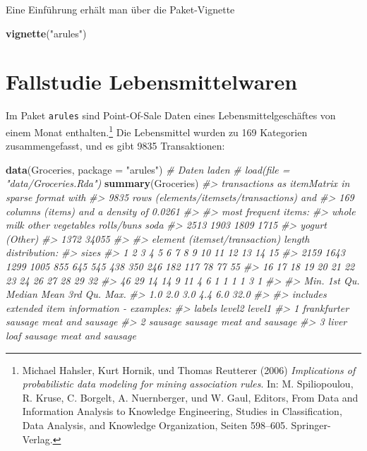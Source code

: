 \documentclass[12pt,]{book}
\newenvironment{Shaded}{\begin{snugshade}}{\end{snugshade}}
\newcommand{\KeywordTok}[1]{\textcolor[rgb]{0.13,0.29,0.53}{\textbf{{#1}}}}
\newcommand{\DataTypeTok}[1]{\textcolor[rgb]{0.13,0.29,0.53}{{#1}}}
\newcommand{\StringTok}[1]{\textcolor[rgb]{0.31,0.60,0.02}{{#1}}}
\newcommand{\CommentTok}[1]{\textcolor[rgb]{0.56,0.35,0.01}{\textit{{#1}}}}
\newcommand{\NormalTok}[1]{{#1}}
\let\rmarkdownfootnote\footnote%
\def\footnote{\protect\rmarkdownfootnote}
\begin{document}
Eine Einführung erhält man über die Paket-Vignette

\begin{Shaded}
\begin{Highlighting}[]
\KeywordTok{vignette}\NormalTok{(}\StringTok{"arules"}\NormalTok{)}
\end{Highlighting}
\end{Shaded}

\section{Fallstudie
Lebensmittelwaren}\label{fallstudie-lebensmittelwaren}

Im Paket \texttt{arules} sind Point-Of-Sale Daten eines
Lebensmittelgeschäftes von einem Monat enthalten.\footnote{Michael
  Hahsler, Kurt Hornik, und Thomas Reutterer (2006) \emph{Implications
  of probabilistic data modeling for mining association rules}. In: M.
  Spiliopoulou, R. Kruse, C. Borgelt, A. Nuernberger, und W. Gaul,
  Editors, From Data and Information Analysis to Knowledge Engineering,
  Studies in Classification, Data Analysis, and Knowledge Organization,
  Seiten 598--605. Springer-Verlag.} Die Lebensmittel wurden zu 169
Kategorien zusammengefasst, und es gibt 9835 Transaktionen:

\begin{Shaded}
\begin{Highlighting}[]
\KeywordTok{data}\NormalTok{(Groceries, }\DataTypeTok{package =} \StringTok{"arules"}\NormalTok{) }\CommentTok{# Daten laden}
\CommentTok{# load(file = "data/Groceries.Rda")}
\KeywordTok{summary}\NormalTok{(Groceries)}
\CommentTok{#> transactions as itemMatrix in sparse format with}
\CommentTok{#>  9835 rows (elements/itemsets/transactions) and}
\CommentTok{#>  169 columns (items) and a density of 0.0261 }
\CommentTok{#> }
\CommentTok{#> most frequent items:}
\CommentTok{#>       whole milk other vegetables       rolls/buns             soda }
\CommentTok{#>             2513             1903             1809             1715 }
\CommentTok{#>           yogurt          (Other) }
\CommentTok{#>             1372            34055 }
\CommentTok{#> }
\CommentTok{#> element (itemset/transaction) length distribution:}
\CommentTok{#> sizes}
\CommentTok{#>    1    2    3    4    5    6    7    8    9   10   11   12   13   14   15 }
\CommentTok{#> 2159 1643 1299 1005  855  645  545  438  350  246  182  117   78   77   55 }
\CommentTok{#>   16   17   18   19   20   21   22   23   24   26   27   28   29   32 }
\CommentTok{#>   46   29   14   14    9   11    4    6    1    1    1    1    3    1 }
\CommentTok{#> }
\CommentTok{#>    Min. 1st Qu.  Median    Mean 3rd Qu.    Max. }
\CommentTok{#>     1.0     2.0     3.0     4.4     6.0    32.0 }
\CommentTok{#> }
\CommentTok{#> includes extended item information - examples:}
\CommentTok{#>        labels  level2           level1}
\CommentTok{#> 1 frankfurter sausage meat and sausage}
\CommentTok{#> 2     sausage sausage meat and sausage}
\CommentTok{#> 3  liver loaf sausage meat and sausage}
\end{Highlighting}
\end{Shaded}
\end{document}
